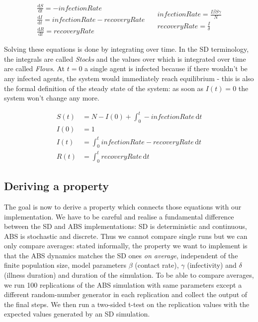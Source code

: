 \begin{equation}
\begin{split}
\frac{\mathrm d S}{\mathrm d t} = -infectionRate \\
\frac{\mathrm d I}{\mathrm d t} = infectionRate - recoveryRate \\
\frac{\mathrm d R}{\mathrm d t} = recoveryRate 
\end{split}
\quad
\begin{split}
infectionRate = \frac{I \beta S \gamma}{N} \\
recoveryRate = \frac{I}{\delta} 
\end{split}
\end{equation}
\label{eq:sir_delta_rates}

Solving these equations is done by integrating over time. In the SD terminology, the integrals are called \textit{Stocks} and the values over which is integrated over time are called \textit{Flows}. At $t = 0$ a single agent is infected because if there wouldn't be any infected agents, the system would immediately reach equilibrium - this is also the formal definition of the steady state of the system: as soon as $I(t) = 0$ the system won't change any more.

\begin{align}
S(t) &= N - I(0) + \int_0^t -infectionRate\, \mathrm{d}t \\
I(0) &= 1 \\
I(t) &= \int_0^t infectionRate - recoveryRate\, \mathrm{d}t \\
R(t) &= \int_0^t recoveryRate\, \mathrm{d}t
\end{align}

\subsection{Deriving a property}
The goal is now to derive a property which connects those equations with our implementation. We have to be careful and realise a fundamental difference between the SD and ABS implementations: SD is deterministic and continuous, ABS is stochastic and discrete. Thus we cannot compare single runs but we can only compare averages: stated informally, the property we want to implement is that the ABS dynamics matches the SD ones \textit{on average}, independent of the finite population size, model parameters $\beta$ (contact rate), $\gamma$ (infectivity) and $\delta$ (illness duration) and duration of the simulation. To be able to compare averages, we run 100 replications of the ABS simulation with same parameters except a different random-number generator in each replication and collect the output of the final steps. We then run a two-sided t-test on the replication values with the expected values generated by an SD simulation.

